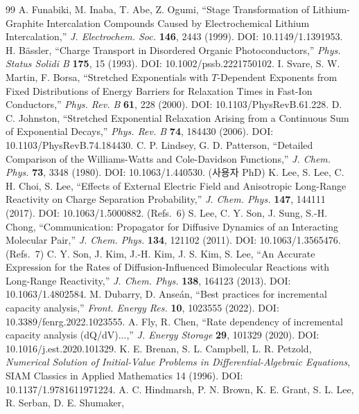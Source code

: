 \documentclass[11pt,a4paper]{article}
\newcommand{\brk}{\discretionary{}{}{}}%
\begin{document}
\begin{thebibliography}{99}
 A. Funabiki, M. Inaba, T. Abe, Z. Ogumi, ``Stage Transformation of
  Lithium-Graphite Intercalation Compounds Caused by Electrochemical Lithium Intercalation,''
  \emph{J. Electrochem. Soc.} \textbf{146}, 2443 (1999). DOI: 10.1149/1.1391953.
 H. B\"assler, ``Charge Transport in Disordered Organic Photoconductors,''
  \emph{Phys. Status Solidi B} \textbf{175}, 15 (1993). DOI: 10.1002/pssb.2221750102.
 I. Svare, S. W. Martin, F. Borsa, ``Stretched Exponentials with $T$-Dependent
  Exponents from Fixed Distributions of Energy Barriers for Relaxation Times in Fast-Ion Conductors,''
  \emph{Phys. Rev. B} \textbf{61}, 228 (2000). DOI: 10.1103/PhysRevB.61.228.
 D. C. Johnston, ``Stretched Exponential Relaxation Arising from a Continuous Sum
  of Exponential Decays,'' \emph{Phys. Rev. B} \textbf{74}, 184430 (2006). DOI: 10.1103/PhysRevB.74.184430.
 C. P. Lindsey, G. D. Patterson, ``Detailed Comparison of the Williams-Watts and
  Cole-Davidson Functions,'' \emph{J. Chem. Phys.} \textbf{73}, 3348 (1980). DOI: 10.1063/1.440530.
 (사용자 PhD) K. Lee, S. Lee, C. H. Choi, S. Lee, ``Effects of External Electric Field and Anisotropic Long-Range Reactivity on Charge Separation Probability,''
  \emph{J. Chem. Phys.} \textbf{147}, 144111 (2017). DOI: 10.1063/1.5000882.
 (Refs.~6) S. Lee, C. Y. Son, J. Sung, S.-H. Chong, ``Communication: Propagator for Diffusive Dynamics of an Interacting Molecular Pair,''
  \emph{J. Chem. Phys.} \textbf{134}, 121102 (2011). DOI: 10.1063/1.3565476.
 (Refs.~7) C. Y. Son, J. Kim, J.-H. Kim, J. S. Kim, S. Lee, ``An Accurate Expression for the Rates of Diffusion-Influenced Bimolecular Reactions with Long-Range Reactivity,''
  \emph{J. Chem. Phys.} \textbf{138}, 164123 (2013). DOI: 10.1063/1.4802584.
 M. Dubarry, D. Anseán, ``Best practices for incremental capacity analysis,''
  \emph{Front. Energy Res.} \textbf{10}, 1023555 (2022). DOI: 10.3389/fenrg.2022.1023555.
 A. Fly, R. Chen, ``Rate dependency of incremental capacity analysis (dQ/dV)...,''
  \emph{J. Energy Storage} \textbf{29}, 101329 (2020). DOI: 10.1016/j.est.2020.101329.
 K. E. Brenan, S. L. Campbell, L. R. Petzold, \emph{Numerical Solution of Initial-Value
  Problems in Differential-Algebraic Equations}, SIAM Classics in Applied Mathematics 14 (1996).
  DOI: 10.1137/\brk 1.9781611971224.
 A. C. Hindmarsh, P. N. Brown, K. E. Grant, S. L. Lee, R. Serban, D. E. Shumaker,

\end{thebibliography}
\end{document}
